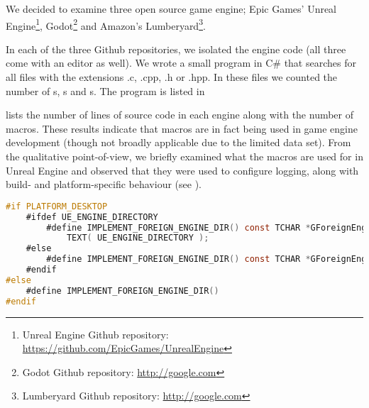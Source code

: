 We decided to examine three open source game engine; Epic Games' Unreal Engine\footnote{Unreal Engine Github repository: \url{https://github.com/EpicGames/UnrealEngine}}, Godot\footnote{Godot Github repository: \url{http://google.com}} and Amazon's Lumberyard\footnote{Lumberyard Github repository: \url{http://google.com}}.

In each of the three Github repositories, we isolated the engine code (all three come with an editor as well). We wrote a small program in C\# that searches for all files with the extensions .c, .cpp, .h or .hpp. In these files we counted the number of s, s and s. The program is listed in 

 lists the number of lines of source code in each engine along with the number of macros. These results indicate that macros are in fact being used in game engine development (though not broadly applicable due to the limited data set). From the qualitative point-of-view, we briefly examined what the macros are used for in Unreal Engine and observed that they were used to configure logging, along with build- and platform-specific behaviour (see ).

\begin{lstlisting}[label={lst:unreal:macro}, caption={A macro found in ModuleManager.h in Unreal Engine}, language={C}]
#if PLATFORM_DESKTOP
	#ifdef UE_ENGINE_DIRECTORY
		#define IMPLEMENT_FOREIGN_ENGINE_DIR() const TCHAR *GForeignEngineDir = 
		    TEXT( UE_ENGINE_DIRECTORY );
	#else
		#define IMPLEMENT_FOREIGN_ENGINE_DIR() const TCHAR *GForeignEngineDir = nullptr;
	#endif
#else
	#define IMPLEMENT_FOREIGN_ENGINE_DIR() 
#endif
\end{lstlisting}

